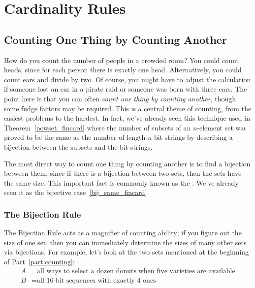 \chapter{Cardinality Rules}\label{counting_chap}

\newcommand{\Jay}{Bob}
\newcommand{\Jer}{Ted}

\section{Counting One Thing by Counting Another}\label{bijection_counting_sec}

How do you count the number of people in a crowded room?  You could
count heads, since for each person there is exactly one head.
Alternatively, you could count ears and divide by two.  Of course, you
might have to adjust the calculation if someone lost an ear in a
pirate raid or someone was born with three ears.  The point here is
that you can often \emph{count one thing by counting another}, though
some fudge factors may be required.  This is a central theme of
counting, from the easiest problems to the hardest.  In fact, we've
already seen this technique used in Theorem~\ref{powset_fincard} where
the number of subsets of an $n$-element set was proved to be the same as
the number of length-$n$ bit-strings by describing a bijection
between the subsets and the bit-strings.

The most direct way to count one thing by counting another is to find
a bijection between them, since if there is a bijection between two
sets, then the sets have the same size.  This important fact is
commonly known as the .  We've already seen it as
the  bijective case~\eqref{bij_same_fincard}.

\subsection{The Bijection Rule}\label{sec:donut_bij}

\iffalse
\begin{rul}[Bijection Rule]\label{rul:bijection}
If there is a bijection $f: A \to B$ between $A$ and~$B$, then
$\card{A} = \card{B}$.
\end{rul}
\fi

The Bijection Rule acts as a magnifier of counting ability; if you
figure out the size of one set, then you can immediately determine the
sizes of many other sets via bijections.  For example, let's look at
the two sets mentioned at the beginning of Part~\ref{part:counting}:
%
\begin{align*}
A & = \text{all ways to select a dozen donuts when five varieties are available} \\
B & = \text{all 16-bit sequences with exactly 4 ones}
\end{align*}

